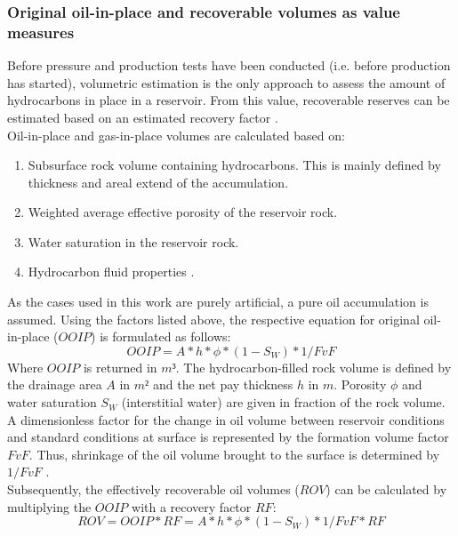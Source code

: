         \subsubsection{Original oil-in-place and recoverable volumes as value measures}
        Before pressure and production tests have been conducted (i.e. before production has started), volumetric estimation is the only approach to assess the amount of hydrocarbons in place in a reservoir. From this value, recoverable reserves can be estimated based on an estimated recovery factor \citep{dean2007volumetric}.\\
        Oil-in-place and gas-in-place volumes are calculated based on:
        \begin{enumerate}
        \item Subsurface rock volume containing hydrocarbons. This is mainly defined by thickness and areal extend of the accumulation.
        \item Weighted average effective porosity of the reservoir rock.
        \item Water saturation in the reservoir rock.
        \item Hydrocarbon fluid properties \citep{dean2007volumetric}.
        \end{enumerate}
        As the cases used in this work are purely artificial, a pure oil accumulation is assumed. Using the factors listed above, the respective equation for original oil-in-place ($OOIP$) is formulated as follows:
        \begin{equation}\label{eq:OOIP}
        OOIP = A * h * \phi * (1 - S_W) * 1/FvF
        \end{equation}
        Where $OOIP$ is returned in $m³$. The hydrocarbon-filled rock volume is defined by the drainage area $A$ in $m²$ and the net pay thickness $h$ in $m$. Porosity $\phi$ and water saturation $S_W$ (interstitial water) are given in fraction of the rock volume. A dimensionless factor for the change in oil volume between reservoir conditions and standard conditions at surface is represented by the formation volume factor $FvF$. Thus, shrinkage of the oil volume brought to the surface is determined by $1/FvF$ \citep{dean2007volumetric}.\\
        Subsequently, the effectively recoverable oil volumes ($ROV$) can be calculated by multiplying the $OOIP$ with a recovery factor $RF$:
        \begin{equation}\label{eq:ROV}
                ROV = OOIP * RF = A * h * \phi * (1 - S_W) * 1/FvF * RF
        \end{equation}
